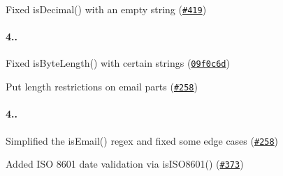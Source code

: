 \begin{DoxyItemize}
\item Fixed {\ttfamily is\+Decimal()} with an empty string (\href{https://github.com/chriso/validator.js/issues/419}{\tt \#419})
\end{DoxyItemize}

\paragraph*{4..}


\begin{DoxyItemize}
\item Fixed {\ttfamily is\+Byte\+Length()} with certain strings (\href{https://github.com/chriso/validator.js/commit/09f0c6d2321f0c78af6a7de42e91b63955e4c01e}{\tt 09f0c6d})
\item Put length restrictions on email parts (\href{https://github.com/chriso/validator.js/issues/258#issuecomment-127173612}{\tt \#258})
\end{DoxyItemize}

\paragraph*{4..}


\begin{DoxyItemize}
\item Simplified the {\ttfamily is\+Email()} regex and fixed some edge cases (\href{https://github.com/chriso/validator.js/issues/258#issuecomment-127173612}{\tt \#258})
\item Added I\+SO 8601 date validation via {\ttfamily is\+I\+S\+O8601()} (\href{https://github.com/chriso/validator.js/issues/373}{\tt \#373}) 
\end{DoxyItemize}